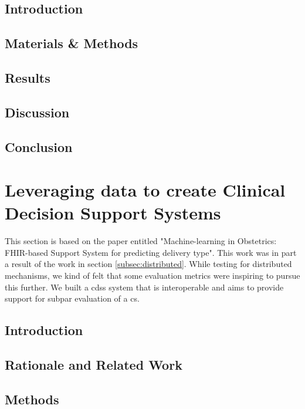     
\subsection{Introduction}
    
    \subsection{Materials \& Methods}
    
    \subsection{Results}
    
    \subsection{Discussion}
    
    \subsection{Conclusion}
    
    
    
    \section{Leveraging data to create Clinical Decision Support Systems}\label{subsec:obs}
    This section is based on the paper entitled "Machine-learning in Obstetrics: FHIR-based Support System for predicting delivery type". This work was in part a result of the work in section \ref{subsec:distributed}. While testing for distributed mechanisms, we kind of felt that some evaluation metrics were inspiring to pursue this further. We built a \ac{cdss} system that is interoperable and aims to provide support for subpar evaluation of a \ac{cs}.
    
    \subsection{Introduction}
    
    \subsection{Rationale and Related Work}
    
    \subsection{Methods}
